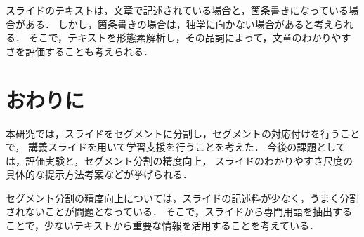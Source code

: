 \documentclass{js}
\begin{document}
スライドのテキストは，文章で記述されている場合と，箇条書きになっている場合がある．
しかし，箇条書きの場合は，独学に向かない場合があると考えられる．
そこで，テキストを形態素解析し，その品詞によって，文章のわかりやすさを評価することも考えられる．





\section{おわりに}

本研究では，スライドをセグメントに分割し，セグメントの対応付けを行うことで，
講義スライドを用いて学習支援を行うことを考えた．
今後の課題としては，評価実験と，セグメント分割の精度向上，
スライドのわかりやすさ尺度の具体的な提示方法考案などが挙げられる．

セグメント分割の精度向上については，スライドの記述料が少なく，うまく分割されないことが問題となっている．
そこで，スライドから専門用語を抽出することで，少ないテキストから重要な情報を活用することを考えている．










\end{document}
